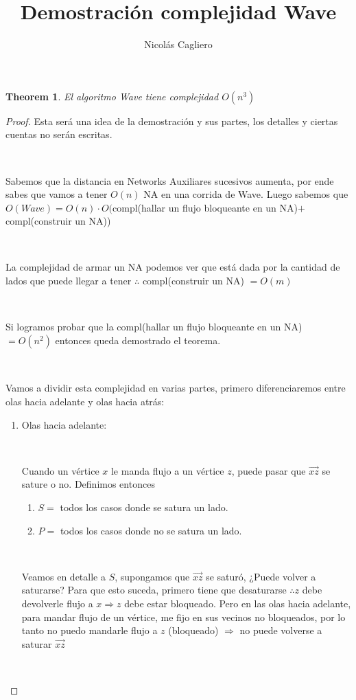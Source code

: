 \documentclass[11pt]{article}
\title{Demostración complejidad Wave}
\author{Nicolás Cagliero}
\newtheorem{theorem}{Theorem}
\begin{document}
\maketitle
\begin{theorem}
El algoritmo Wave tiene complejidad $O(n^{3}) $
\end{theorem}

\begin{proof}
Esta será una idea de la demostración y sus partes, los detalles y ciertas cuentas no serán escritas.\par
\

Sabemos que la distancia en Networks Auxiliares sucesivos aumenta, por ende sabes que vamos a tener $O(n)$ NA en una corrida de Wave. Luego sabemos que $O(Wave) = O(n) \cdot O($compl(hallar un flujo bloqueante en un NA)$ + $compl(construir un NA))\par
\

La complejidad de armar un NA podemos ver que está dada por la cantidad de lados que puede llegar a tener $\therefore$ compl(construir un NA) $ = O(m)$\par
\

Si logramos probar que la compl(hallar un flujo bloqueante en un NA) $ = O(n^{2})$ entonces queda demostrado el teorema.\par
\

Vamos a dividir esta complejidad en varias partes, primero diferenciaremos entre olas hacia adelante y olas hacia atrás:
\begin{enumerate}
\item Olas hacia adelante: \par
\

Cuando un vértice $x$ le manda flujo a un vértice $z$, puede pasar que $\overrightarrow{xz}$ se sature o no. Definimos entonces \par
\begin{enumerate}
	\item $S = $ todos los casos donde se satura un lado.\par
	\item $P = $ todos los casos donde no se satura un lado.\par
\end{enumerate}
\

Veamos en detalle a $S$, supongamos que $\overrightarrow{xz}$ se saturó, ¿Puede volver a saturarse? Para que esto suceda, primero tiene que desaturarse $\therefore z$ debe devolverle flujo a $x \Rightarrow z$ debe estar bloqueado. Pero en las olas hacia adelante, para mandar flujo de un vértice, me fijo en sus vecinos no bloqueados, por lo tanto no puedo mandarle flujo a $z$ (bloqueado) $\Rightarrow$ no puede volverse a saturar $\overrightarrow{xz}$\par
\


\end{enumerate}
\end{proof}
\end{document}
